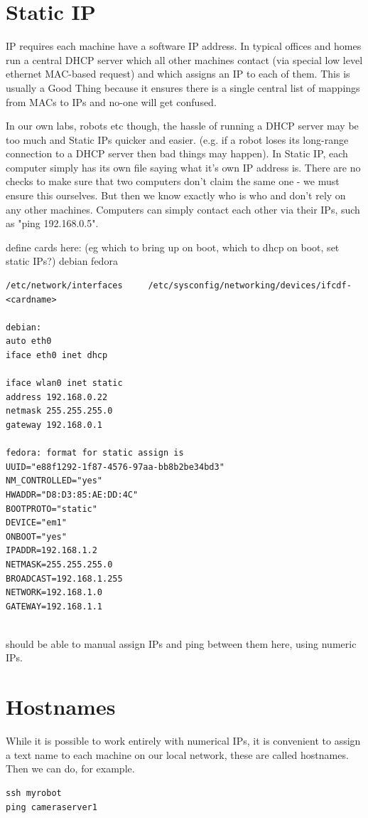\documentclass[oneside,english]{scrbook}
\begin{document}
\section{Static IP}

IP requires each machine have a software IP address.  In typical offices and homes run a central DHCP server which all other machines contact (via special low level ethernet MAC-based request) and which assigns an IP to each of them.  This is usually a Good Thing because it ensures there is a single central list of mappings from MACs to IPs and no-one will get confused.  

In our own labs, robots etc though, the hassle of running a DHCP server may be too much and Static IPs quicker and easier.  (e.g. if a robot loses its long-range connection to a DHCP server then bad things may happen).   In Static IP, each computer simply has its own file saying what it's own IP address is.  There are no checks to make sure that two computers don't claim the same one - we must ensure this ourselves.  But then we know exactly who is who and don't rely on any other machines.  Computers can simply contact each other via their IPs, such as "ping 192.168.0.5".

define cards here:   (eg which to bring up on boot, which to dhcp on boot, set static IPs?) 
debian              fedora 
\begin{lstlisting}
/etc/network/interfaces     /etc/sysconfig/networking/devices/ifcdf-<cardname>  

debian:
auto eth0
iface eth0 inet dhcp 

iface wlan0 inet static
address 192.168.0.22
netmask 255.255.255.0
gateway 192.168.0.1

fedora: format for static assign is 
UUID="e88f1292-1f87-4576-97aa-bb8b2be34bd3" 
NM_CONTROLLED="yes" 
HWADDR="D8:D3:85:AE:DD:4C" 
BOOTPROTO="static"
DEVICE="em1"
ONBOOT="yes"
IPADDR=192.168.1.2
NETMASK=255.255.255.0
BROADCAST=192.168.1.255
NETWORK=192.168.1.0
GATEWAY=192.168.1.1
    
\end{lstlisting}

should be able to manual assign IPs and ping between them here, using numeric IPs.

\section{Hostnames}

While it is possible to work entirely with numerical IPs, it is convenient to assign a text name to each machine on our local network, these are called hostnames.  Then we can do, for example.
\begin{lstlisting}
ssh myrobot
ping cameraserver1
\end{lstlisting}
\end{document}
